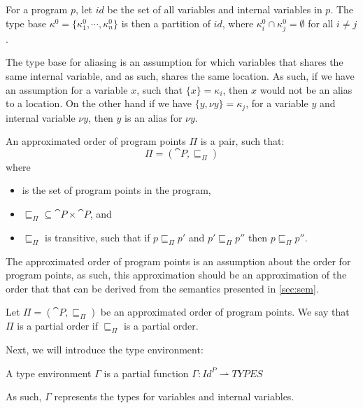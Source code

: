 \documentclass[../../master.tex]{subfiles}
\begin{document}
\begin{definition}
	For a program $p$, let $id$ be the set of all variables and internal variables in $p$.
	The type base $\kappa^0=\{\kappa^0_1,\cdots,\kappa^0_n\}$ is then a partition of $id$, where $\kappa_i^0\cap\kappa_j^0=\emptyset$ for all $i\neq j$.
\end{definition}

The type base for aliasing is an assumption for which variables that shares the same internal variable, and as such, shares the same location.
As such, if we have an assumption for a variable $x$, such that $\{x\}=\kappa_i$, then $x$ would not be an alias to a location.
On the other hand if we have $\{y,\nu y\}=\kappa_j$, for a variable $y$ and internal variable $\nu y$, then $y$ is an alias for $\nu y$.

\begin{definition}
	An approximated order of program points $\Pi$ is a pair, such that: 
	$$\Pi=(\cat{P},\sqsubseteq_\Pi)$$
	where
	\begin{itemize}
		\item {} is the set of program points in the program,
		\item $\sqsubseteq_\Pi\subseteq\cat{P}\times\cat{P}$, and
		\item $\sqsubseteq_\Pi$ is transitive, such that if $p\sqsubseteq_\Pi p'$ and $p'\sqsubseteq_\Pi p''$ then $p\sqsubseteq_\Pi p''$.
	\end{itemize}
\end{definition}

The approximated order of program points is an assumption about the order for program points, as such, this approximation should be an approximation of the order that that can be derived from the semantics presented in \cref{sec:sem}.

\begin{definition}
	Let $\Pi=(\cat{P},\sqsubseteq_\Pi)$ be an approximated order of program points.
	We say that $\Pi$ is a partial order if $\sqsubseteq_\Pi$ is a partial order.
\end{definition}
\bigskip

Next, we will introduce the type environment:
\begin{definition}
	A type environment $\Gamma$ is a partial function $\Gamma:Id^P\rightharpoonup TYPES$
\end{definition}
As such, $\Gamma$ represents the types for variables and internal variables.
\end{document}
